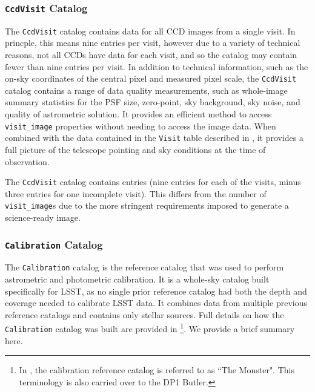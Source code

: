 \subsubsection{\texttt{CcdVisit} Catalog}
The \texttt{CcdVisit} catalog \citep[][]{10.71929/rubin/2570331} contains data for all \gls{CCD} images from a single visit. In princple, this means nine entries per visit, however due to a variety of technical reasons, not all \gls{CCD}s have data for each visit, and so the catalog may contain fewer than nine entries per visit.
In addition to technical information, such as the on-sky coordinates of the central pixel and measured pixel scale, the \texttt{CcdVisit} catalog contains a range of data quality measurements, such as whole-image summary statistics for the \gls{PSF} size, zero-point, sky \gls{background}, sky noise, and quality of astrometric solution.
It provides an efficient method to access \texttt{visit\_image} properties without needing to access the image data.
When combined with the data contained in the \texttt{Visit} table described in , it provides a full picture of the telescope pointing and sky conditions at the time of observation.

The \texttt{CcdVisit} catalog contains \nvisitdetectorsummaries entries (nine entries for each of the \nvisitsummaries visits, minus three entries for one incomplete visit). This differs from the number of \texttt{visit\_image}s due to the more stringent requirements imposed to generate a science-ready image.

\subsubsection{\texttt{Calibration} Catalog}
\label{sssec:monster}
The \texttt{Calibration} catalog is the reference catalog that was used to perform astrometric and photometric \gls{calibration}.
It is a whole-sky catalog built specifically for \gls{LSST}, as no single prior reference catalog had both the depth and coverage needed to calibrate \gls{LSST} data.
It combines data from multiple previous reference catalogs and contains only stellar sources.
Full details on how the \texttt{Calibration} catalog was built are provided in \cite{DMTN-277}
\footnote{In \cite{DMTN-277},  the calibration reference catalog is referred to as ``The Monster". This terminology is also carried over to the \gls{DP1} Butler.}.
We provide a brief summary here.

